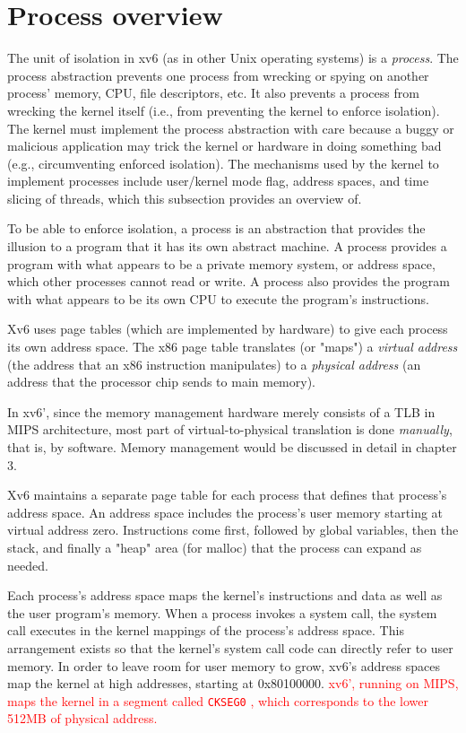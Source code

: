 \documentclass{report}
\newenvironment{hilight}{\color{red}}{\color{black}}
\begin{document}
	\section{Process overview}
	The unit of isolation in xv6 (as in other Unix operating systems) is a \emph{process}.
	The process abstraction prevents one process from wrecking or spying on another 
	process' memory, CPU, file descriptors, etc. It also prevents a process from wrecking the
	kernel itself (i.e., from preventing the kernel to enforce isolation). The kernel must
	implement the process abstraction with care because a buggy or malicious application
	may trick the kernel or hardware in doing something bad (e.g., circumventing enforced
	isolation). The mechanisms used by the kernel to implement processes include 
	user/kernel mode flag, address spaces, and time slicing of threads, which this subsection
	provides an overview of.
	
	To be able to enforce isolation, a process is an abstraction that provides the 
	illusion to a program that it has its own abstract machine. A process provides a program
	with what appears to be a private memory system, or address space, which other
	processes cannot read or write. A process also provides the program with what 
	appears to be its own CPU to execute the program's instructions.
	
	Xv6 uses page tables (which are implemented by hardware) to give each process
	its own address space. The x86 page table translates (or "maps") a \emph{virtual address}
	(the address that an x86 instruction manipulates) to a \emph{physical address} (an address
	that the processor chip sends to main memory).
	
	\begin{hilight}
		In xv6', since the memory management hardware merely consists of a TLB in MIPS
		architecture, most part of virtual-to-physical translation is done \emph{manually},
		that is, by software.  Memory management would be discussed in detail in chapter 3.
	\end{hilight}
	
	Xv6 maintains a separate page table for each process that defines that process's
	address space. An address space includes the process's
	user memory starting at virtual address zero. Instructions come first, followed by global 
	variables, then the stack, and finally a "heap" area (for malloc) that the process can
	expand as needed.
	
	Each process's address space maps the kernel's instructions and data as well as the
	user program's memory. When a process invokes a system call, the system call executes 
	in the kernel mappings of the process's address space. This arrangement exists
	so that the kernel's system call code can directly refer to user memory. In order to
	leave room for user memory to grow, xv6's address spaces map the kernel at high 
	addresses, starting at 0x80100000.  \textcolor{red}{
		xv6', running on MIPS, maps the kernel in a segment called \texttt{CKSEG0}
		, which
		corresponds to the lower 512MB of physical address.
	}
	
\end{document}
